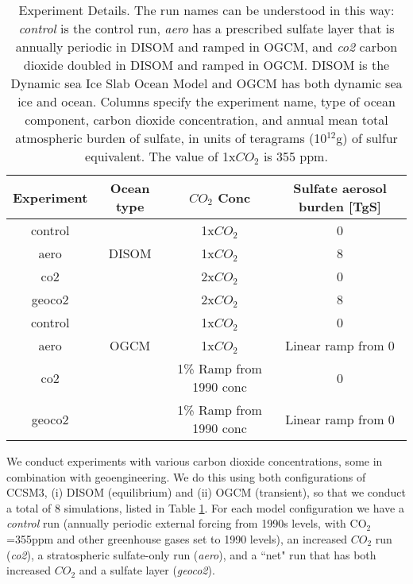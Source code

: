 \documentclass[12pt]{article}
\begin{document}
\begin{table}[t]
\centering
\caption{Experiment Details. The run names can be understood in this way: \textit{control} is the control run, \textit{aero} has a prescribed sulfate layer that is annually periodic in DISOM and ramped in OGCM, and \textit{co2} carbon dioxide doubled in DISOM and ramped in OGCM. DISOM is the Dynamic sea Ice Slab Ocean Model and OGCM has both dynamic sea ice and ocean. Columns specify the experiment name, type of ocean component, carbon dioxide concentration, and annual mean total atmospheric burden of sulfate, in units of teragrams (10$^{12}$g) of sulfur equivalent. The value of 1x$CO_2$ is 355 ppm.
}
\vspace{0.5cm}
\begin{tabular}{|c|c|cc|}
    \hline
Experiment & Ocean type     &  $CO_2$ Conc   & Sulfate aerosol burden [TgS]\\
    \hline
control              &                                      & 1x$CO_2$  & 0\\
aero              & DISOM   &    1x$CO_2$          & 8 \\
co2   &                                  & 2x$CO_2$ & 0 \\
geoco2   &                          & 2x$CO_2$  & 8\\
\hline
control                 &                             &  1x$CO_2$ & 0\\
aero                  &   OGCM              &  1x$CO_2$   &  Linear ramp from 0\\
co2             &                         & 1\% Ramp from 1990 conc       &  0\\
geoco2 &  & 1\% Ramp from 1990 conc & Linear ramp from 0\\
    \hline    
\end{tabular}
\label{tbl:experiments}
\end{table}

We conduct experiments with various carbon dioxide concentrations, some in combination with geoengineering. We do this using both configurations of CCSM3, (i) DISOM (equilibrium) and (ii) OGCM (transient), so that we conduct a total of 8 simulations, listed in Table \ref{tbl:experiments}. For each model configuration we have a \textit{control} run (annually periodic external forcing from 1990s levels, with CO$_2$=355ppm and other greenhouse gases set to 1990 levels), an increased $CO_2$ run (\textit{co2}), a stratospheric sulfate-only run (\textit{aero}), and a ``net" run that has both increased $CO_2$ and a sulfate layer (\textit{geoco2}).
\end{document}
